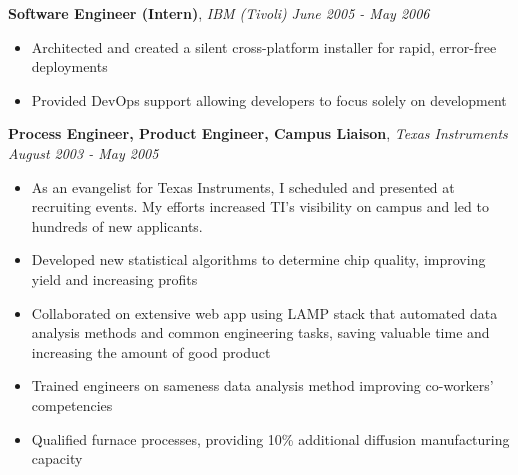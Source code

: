\documentclass[9pt]{article}
\newenvironment{changemargin}[2]{%
  \begin{list}{}{%
    \setlength{\topsep}{0pt}%
    \setlength{\leftmargin}{#1}%
    \setlength{\rightmargin}{#2}%
    \setlength{\listparindent}{\parindent}%
    \setlength{\itemindent}{\parindent}%
    \setlength{\parsep}{\parskip}%
  }%
  \item[]}{\end{list}
}
\newcommand{\jobdescription}[1]{
	\begin{changemargin}{0.15in}{0.15in}
    \smallskip
		{#1}
    \medskip
	\end{changemargin}
}
\newcommand{\jobtitle}[3]{
	\textbf{#1}, \emph{#2} \hfill \emph{#3}\\
}
\newenvironment{body} {
	\vspace*{-16pt}
	\begin{changemargin}{-0.25in}{-0.5in}
  }	
	{\end{changemargin}
}
\begin{document}
\begin{body}
	\jobtitle{Software Engineer (Intern)}{IBM (Tivoli)}{June 2005 - May 2006}
  \jobdescription {
  	\begin{itemize} \itemsep -0pt
      \item Architected and created a silent cross-platform installer for rapid, error-free deployments
      \item Provided DevOps support allowing developers to focus solely on development
    \end{itemize}
  }


	\jobtitle{Process Engineer, Product Engineer, Campus Liaison}{Texas Instruments}{August 2003 - May 2005}
  \jobdescription {
  	\begin{itemize} \itemsep -0pt
      \item As an evangelist for Texas Instruments, I scheduled and presented at recruiting events. My efforts increased TI's visibility on campus and led to hundreds of new applicants.
  		\item Developed new statistical algorithms to determine chip quality, improving yield and increasing profits
  		\item Collaborated on extensive web app using LAMP stack that automated data analysis methods and common engineering tasks, saving valuable time and increasing the amount of good product
  		\item Trained engineers on sameness data analysis method improving co-workers' competencies
  		\item Qualified furnace processes, providing 10\% additional diffusion manufacturing capacity
  	\end{itemize}
  }


\end{body}
\end{document}
